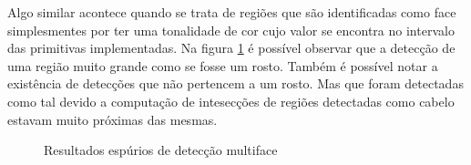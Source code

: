 \documentclass[journal,onecolumn]{IEEEtran}
\begin{document}
	Algo similar acontece quando se trata de regiões que são identificadas como face simplesmentes por ter uma tonalidade de cor cujo valor se encontra no intervalo das primitivas implementadas.	
	Na figura \ref{fig:badMultifaceDetection} é possível observar que a detecção de uma região muito grande como se fosse um rosto.
	Também é possível notar a existência de detecções que não pertencem a um rosto.
	Mas que foram detectadas como tal devido a computação de intesecções de regiões detectadas como cabelo estavam muito próximas das mesmas.
\begin{figure}[htb]
\caption{Resultados espúrios de detecção multiface}
\label{fig:badMultifaceDetection}
\end{figure} 
\end{document}
